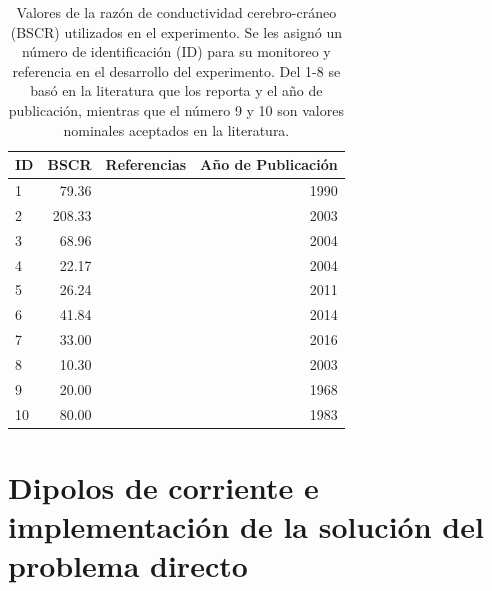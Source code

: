 \begin{table}[p]
	\centering
	\begin{tabular}{lrrr}
		\toprule
		ID & BSCR   & Referencias  & Año de Publicación \\ \midrule
		1  & 79.36  & \cite{Cohen1983} & 1990 \\
		2  & 208.33 & \cite{eriksenVivoHumanHead1990} & 2003 \\
		3  & 68.96  & \cite{gonalvesVivoMeasurementBrain2003} & 2004 \\
		4  & 22.17  & \cite{Baysal2004} & 2004 \\
		5  & 26.24  & \cite{Gutierrez2004} & 2011 \\
		6  & 41.84  & \cite{Dannhauer2011} & 2014 \\
		7  & 33.00  & \cite{aydinCombiningEEGMEG2014a} & 2016 \\
		8  & 10.30  & \cite{acarHighresolutionEEGSource2016} & 2003 \\
		9  & 20.00  & \cite{hoekemaMeasurementConductivitySkull2003} & 1968 \\
		10 & 80.00  & \cite{Rush1968} & 1983 \\ \bottomrule
	\end{tabular}
	\caption{Valores de la razón de conductividad cerebro-cráneo (BSCR) utilizados en el experimento. Se les asignó un número de identificación (ID) para su monitoreo y referencia en el desarrollo del experimento. Del 1-8 se basó en la literatura que los reporta y el año de publicación, mientras que el número 9 y 10 son valores nominales aceptados en la literatura.}
	\label{tab:bscr}
\end{table}

\section{Dipolos de corriente e implementación de la solución del problema directo}
\label{sec:methodology:direct_solved}

